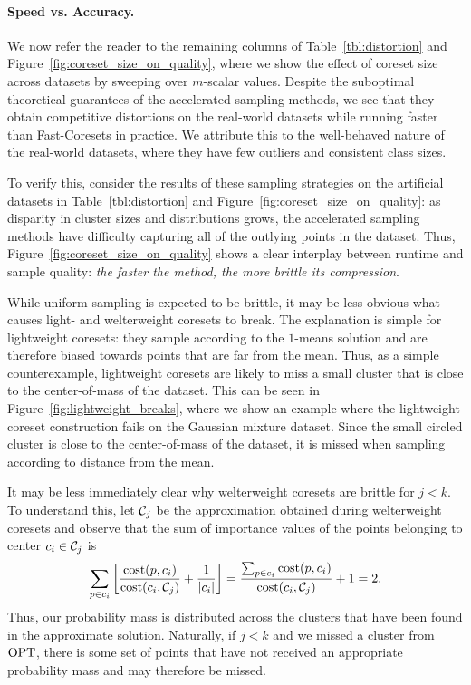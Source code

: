\paragraph*{Speed vs. Accuracy.}



We now refer the reader to the remaining columns of Table~\ref{tbl:distortion} and Figure~\ref{fig:coreset_size_on_quality}, where we show the effect of coreset
size across datasets by sweeping over $m$-scalar values. Despite the suboptimal theoretical guarantees of the accelerated sampling methods, we see that they
obtain competitive distortions on the real-world datasets while running faster than Fast-Coresets in practice. We attribute this to the well-behaved nature of
the real-world datasets, where they have few outliers and consistent class sizes.

To verify this, consider the results of these sampling strategies on the artificial datasets in Table~\ref{tbl:distortion} and
Figure~\ref{fig:coreset_size_on_quality}: as disparity in cluster sizes and distributions grows, the accelerated sampling methods have difficulty capturing all
of the outlying points in the dataset. Thus, Figure~\ref{fig:coreset_size_on_quality} shows a clear interplay between runtime and sample quality: \emph{the
faster the method, the more brittle its compression}.



While uniform sampling is expected to be brittle, it may be less obvious what causes light- and welterweight coresets to break. The explanation is simple for
lightweight coresets: they sample according to the $1$-means solution and are therefore biased towards points that are far from the mean. Thus, as a simple
counterexample, lightweight coresets are likely to miss a small cluster that is close to the center-of-mass of the dataset. This can be seen in
Figure~\ref{fig:lightweight_breaks}, where we show an example where the lightweight coreset construction fails on the Gaussian mixture dataset. Since the small
circled cluster is close to the center-of-mass of the dataset, it is missed when sampling according to distance from the mean.

It may be less immediately clear why welterweight coresets are brittle for $j < k$. To understand this, let $\mathcal C_j$ be the approximation obtained during
welterweight coresets and observe that the sum of importance values of the points belonging to center $c_i \in \mathcal C_j$ is \[ \sum_{p \in c_i} \left[
\dfrac{\operatorname{cost}(p, c_i)}{\operatorname{cost}(c_i, \mathcal C_j)} + \dfrac{1}{|c_i|} \right] = \dfrac{\sum_{p \in c_i} \operatorname{cost}(p, c_i)}{\operatorname{cost}(c_i, \mathcal C_j)} + 1 = 2.\] Thus, our
probability mass is distributed across the clusters that have been found in the approximate solution. Naturally, if $j < k$ and we missed a cluster from $\text{OPT}$,
there is some set of points that have not received an appropriate probability mass and may therefore be missed.

